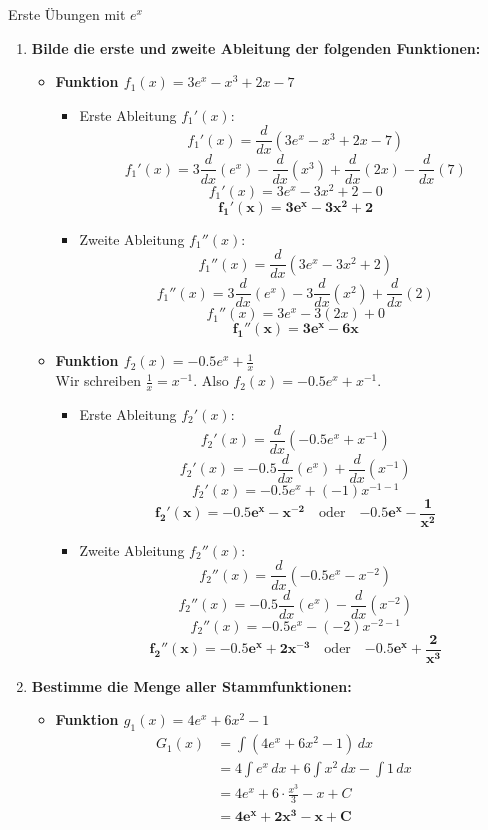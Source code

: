 \begin{loesungsumgebung}{Erste Übungen mit $e^x$}

\begin{enumerate}[label=(\alph*)]
    \item \textbf{Bilde die erste und zweite Ableitung der folgenden Funktionen:}
    \begin{itemize}
        \item \textbf{Funktion $f_1(x) = 3e^x - x^3 + 2x - 7$}
        \begin{itemize}
            \item Erste Ableitung $f_1'(x)$:
            $$ f_1'(x) = \frac{d}{dx}(3e^x - x^3 + 2x - 7) $$
            $$ f_1'(x) = 3\frac{d}{dx}(e^x) - \frac{d}{dx}(x^3) + \frac{d}{dx}(2x) - \frac{d}{dx}(7) $$
            $$ f_1'(x) = 3e^x - 3x^2 + 2 - 0 $$
            $$ \mathbf{f_1'(x) = 3e^x - 3x^2 + 2} $$
            \item Zweite Ableitung $f_1''(x)$:
            $$ f_1''(x) = \frac{d}{dx}(3e^x - 3x^2 + 2) $$
            $$ f_1''(x) = 3\frac{d}{dx}(e^x) - 3\frac{d}{dx}(x^2) + \frac{d}{dx}(2) $$
            $$ f_1''(x) = 3e^x - 3(2x) + 0 $$
            $$ \mathbf{f_1''(x) = 3e^x - 6x} $$
        \end{itemize}

        \item \textbf{Funktion $f_2(x) = -0.5e^x + \frac{1}{x}$} \\
        Wir schreiben $\frac{1}{x} = x^{-1}$. Also $f_2(x) = -0.5e^x + x^{-1}$.
        \begin{itemize}
            \item Erste Ableitung $f_2'(x)$:
            $$ f_2'(x) = \frac{d}{dx}(-0.5e^x + x^{-1}) $$
            $$ f_2'(x) = -0.5\frac{d}{dx}(e^x) + \frac{d}{dx}(x^{-1}) $$
            $$ f_2'(x) = -0.5e^x + (-1)x^{-1-1} $$
            $$ \mathbf{f_2'(x) = -0.5e^x - x^{-2}} \quad \text{oder} \quad \mathbf{-0.5e^x - \frac{1}{x^2}} $$
            \item Zweite Ableitung $f_2''(x)$:
            $$ f_2''(x) = \frac{d}{dx}(-0.5e^x - x^{-2}) $$
            $$ f_2''(x) = -0.5\frac{d}{dx}(e^x) - \frac{d}{dx}(x^{-2}) $$
            $$ f_2''(x) = -0.5e^x - (-2)x^{-2-1} $$
            $$ \mathbf{f_2''(x) = -0.5e^x + 2x^{-3}} \quad \text{oder} \quad \mathbf{-0.5e^x + \frac{2}{x^3}} $$
        \end{itemize}
    \end{itemize}

    \item \textbf{Bestimme die Menge aller Stammfunktionen:}
    \begin{itemize}
        \item \textbf{Funktion $g_1(x) = 4e^x + 6x^2 - 1$}
        \begin{align*} G_1(x) &= \int (4e^x + 6x^2 - 1) \,dx \\ &= 4\int e^x \,dx + 6\int x^2 \,dx - \int 1 \,dx \\ &= 4e^x + 6 \cdot \frac{x^3}{3} - x + C \\ &= \mathbf{4e^x + 2x^3 - x + C} \end{align*}


\end{itemize}
\end{enumerate}
\end{loesungsumgebung}
